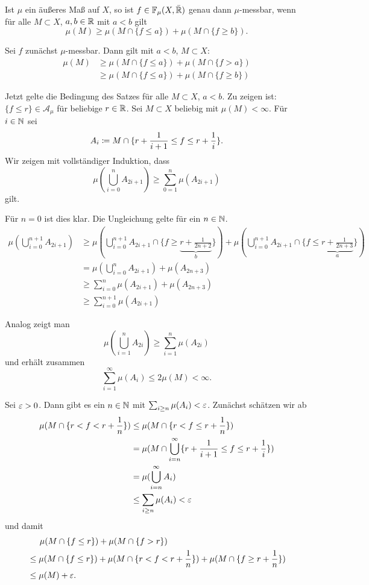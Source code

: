 \documentclass[a4paper,twoside,DIV15,BCOR12mm]{scrbook}
\newcommand{\A}{\mathcal A}
\begin{document}
\begin{satz}
\label{satz:1.8}
Ist $\mu$ ein äußeres Maß auf $X$, so ist $f\in \mathbb F_\mu(X,\bar{\mathbb{R}})$ genau dann $\mu$-messbar, wenn für alle $M\subset X$, $a,b\in\mathbb{R}$ mit $a<b$ gilt
\[
\mu(M) \ge \mu(M\cap \{f \le a\}) + \mu(M\cap \{f\ge b\}).
\]
\end{satz}

\begin{beweis}
Sei $f$ zunächst $\mu$-messbar. Dann gilt mit $a<b$, $M\subset X$: 
\begin{align*}
\mu(M) &\ge \mu(M\cap\{f\le a\} ) + \mu(M\cap \{f> a\}) \\
&\ge \mu(M\cap\{f\le a\} ) + \mu(M\cap \{f\ge b\}) 
\end{align*}

Jetzt gelte die Bedingung des Satzes für alle $M\subset X$, $a<b$. Zu zeigen ist: $\{f\le r\}\in \A_\mu$ für beliebige $r\in\mathbb{R}$. Sei $M\subset X$ beliebig mit $\mu(M) <\infty$. Für $i\in \mathbb{N}$ sei
\[
A_i \da M\cap \{r + \frac1{i+1} \le f \le r+\frac 1i\}.
\]
Wir zeigen mit vollständiger Induktion, dass 
\[
\mu(\bigcup_{i=0}^n A_{2i+1})  \ge \sum_{0=1}^n \mu(A_{2i+1})
\]
gilt.

Für $n=0$ ist dies klar. Die Ungleichung gelte für ein $n\in\mathbb{N}$.
\begin{align*}
\mu(\bigcup_{i=0}^{n+1} A_{2i+1}) 
&\ge \mu(\bigcup_{i=0}^{n+1} A_{2i+1} \cap \{f\ge \underbrace{r+ \frac1{2n+2}}_{b}\}) + 
     \mu(\bigcup_{i=0}^{n+1} A_{2i+1} \cap \{f\le \underbrace{r+\frac1{2n+3}}_{a}\}) \\
&= \mu(\bigcup_{i=0}^n A_{2i+1}) + \mu(A_{2n+3}) \\
&\ge \sum_{i=0}^n \mu(A_{2i+1}) + \mu(A_{2n+3}) \\
&\ge \sum_{i=0}^{n+1} \mu(A_{2i+1})
\end{align*}

Analog zeigt man 
\[
\mu(\bigcup_{i=1}^n A_{2i})  \ge \sum_{i=1}^n \mu(A_{2i})
\]
und erhält zusammen
\[
\sum_{i=1}^\infty \mu(A_i) \le 2 \mu(M) <\infty.
\]

Sei $\varepsilon>0$. Dann gibt es ein $n\in\mathbb{N}$ mit $\sum_{i\ge n}\mu(A_i) <\varepsilon$. Zunächst schätzen wir ab
\begin{align*}
\mu(M\cap \{r < f < r+\frac1n\}) 
&\le \mu(M\cap \{r<f\le r + \frac1n\}) \\
&= \mu(M\cap \bigcup_{i=n}^\infty \{r +\frac 1{i+1} \le f \le r+\frac 1i\}) \\
&= \mu(\bigcup_{i=n}^\infty A_i) \\
&\le \sum_{i\ge n} \mu(A_i) < \varepsilon
\end{align*}
und damit
\begin{align*}
&\phantom{=\ \ }\mu(M\cap \{f\le r\}) + \mu(M\cap \{f>r\})  \\
&\le \mu(M\cap \{f\le r\}) + \mu(M\cap \{r<f<r+\frac1n\}) + \mu(M\cap \{f\ge r+\frac 1n\}) \\
&\le \mu(M) + \varepsilon.
\end{align*}
\end{beweis}
\end{document}
